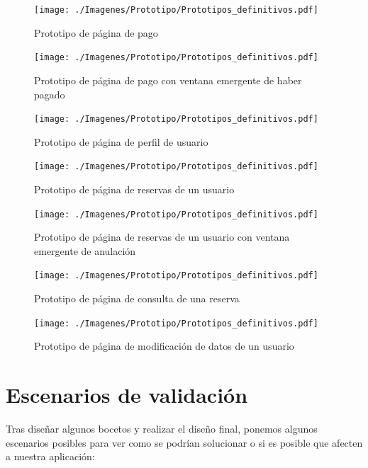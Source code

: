 \begin{figure}[H]
    \centering
    \texttt{[image: ./Imagenes/Prototipo/Prototipos\_definitivos.pdf]}
    \caption{Prototipo de página de pago}
    \label{fig:prot_pago}
\end{figure}

\begin{figure}[H]
    \centering
    \texttt{[image: ./Imagenes/Prototipo/Prototipos\_definitivos.pdf]}
    \caption{Prototipo de página de pago con ventana emergente de haber pagado}
    \label{fig:prot_pago_popup}
\end{figure}

\begin{figure}[H]
    \centering
    \texttt{[image: ./Imagenes/Prototipo/Prototipos\_definitivos.pdf]}
    \caption{Prototipo de página de perfil de usuario}
    \label{fig:prot_perfil}
\end{figure}

\begin{figure}[H]
    \centering
    \texttt{[image: ./Imagenes/Prototipo/Prototipos\_definitivos.pdf]}
    \caption{Prototipo de página de reservas de un usuario}
    \label{fig:prot_reservas_usuario}
\end{figure}

\begin{figure}[H]
    \centering
    \texttt{[image: ./Imagenes/Prototipo/Prototipos\_definitivos.pdf]}
    \caption{Prototipo de página de reservas de un usuario con ventana emergente de anulación}
    \label{fig:prot_reservas_usuario_popup}
\end{figure}

\begin{figure}[H]
    \centering
    \texttt{[image: ./Imagenes/Prototipo/Prototipos\_definitivos.pdf]}
    \caption{Prototipo de página de consulta de una reserva}
    \label{fig:prot_reservas_mod}
\end{figure}

\begin{figure}[H]
    \centering
    \texttt{[image: ./Imagenes/Prototipo/Prototipos\_definitivos.pdf]}
    \caption{Prototipo de página de modificación de datos de un usuario}
    \label{fig:prot_usuario_mod}
\end{figure}




\section{Escenarios de validación}
Tras diseñar algunos bocetos y realizar el diseño final, ponemos algunos escenarios posibles para ver como se podrían solucionar o si es posible que afecten a nuestra aplicación:

